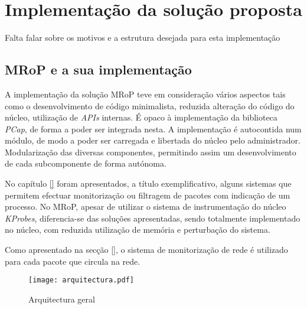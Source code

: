 \chapter{Implementação da solução proposta}
\label{cap:Implementacao}

Falta falar sobre os motivos e a estrutura desejada para esta implementação

\section{MRoP e a sua implementação}
\label{sec:mrop_implementation}

A implementação da solução MRoP teve em consideração vários aspectos tais como o desenvolvimento de código minimalista, reduzida alteração do código do núcleo, utilização de \textit{APIs} internas.
É opaco à implementação da biblioteca \textit{PCap}, de forma a poder ser integrada nesta.
A implementação é autocontida num módulo, de modo a poder ser carregada e libertada do núcleo pelo administrador.
Modularização das diversas componentes, permitindo assim um desenvolvimento de cada subcomponente de forma autónoma.

No capítulo \ref{} foram apresentados, a título exemplificativo, alguns sistemas que permitem efectuar monitorização ou filtragem de pacotes com indicação de um processo.
No MRoP, apesar de utilizar o sistema de instrumentação do núcleo \textit{KProbes}, diferencia-se das soluções apresentadas, sendo totalmente implementado no núcleo, com reduzida utilização de memória e perturbação do sistema.

Como apresentado na secção \ref{}, o sistema de monitorização de rede é utilizado para cada pacote que circula na rede.

\begin{figure}[ht]
\centering
\texttt{[image: arquitectura.pdf]}
\caption{Arquitectura geral}
\label{fig:general_architecture}
\end{figure}







